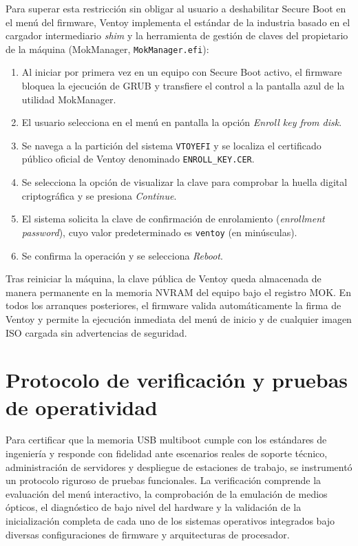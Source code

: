 \documentclass[12pt]{article}
\begin{document}
Para superar esta restricción sin obligar al usuario a deshabilitar Secure Boot en el menú del firmware, Ventoy implementa el estándar de la industria basado en el cargador intermediario \textit{shim} y la herramienta de gestión de claves del propietario de la máquina (MokManager, \texttt{MokManager.efi}):
\begin{enumerate}[noitemsep, topsep=2pt]
    \item Al iniciar por primera vez en un equipo con Secure Boot activo, el firmware bloquea la ejecución de GRUB y transfiere el control a la pantalla azul de la utilidad MokManager.
    \item El usuario selecciona en el menú en pantalla la opción \textit{Enroll key from disk}.
    \item Se navega a la partición del sistema \texttt{VTOYEFI} y se localiza el certificado público oficial de Ventoy denominado \texttt{ENROLL\_KEY.CER}.
    \item Se selecciona la opción de visualizar la clave para comprobar la huella digital criptográfica y se presiona \textit{Continue}.
    \item El sistema solicita la clave de confirmación de enrolamiento (\textit{enrollment password}), cuyo valor predeterminado es \texttt{ventoy} (en minúsculas).
    \item Se confirma la operación y se selecciona \textit{Reboot}.
\end{enumerate}

Tras reiniciar la máquina, la clave pública de Ventoy queda almacenada de manera permanente en la memoria NVRAM del equipo bajo el registro MOK. En todos los arranques posteriores, el firmware valida automáticamente la firma de Ventoy y permite la ejecución inmediata del menú de inicio y de cualquier imagen ISO cargada sin advertencias de seguridad.

\section{Protocolo de verificación y pruebas de operatividad}
\label{sec:protocoloVerificacion}

Para certificar que la memoria USB multiboot cumple con los estándares de ingeniería y responde con fidelidad ante escenarios reales de soporte técnico, administración de servidores y despliegue de estaciones de trabajo, se instrumentó un protocolo riguroso de pruebas funcionales. La verificación comprende la evaluación del menú interactivo, la comprobación de la emulación de medios ópticos, el diagnóstico de bajo nivel del hardware y la validación de la inicialización completa de cada uno de los sistemas operativos integrados bajo diversas configuraciones de firmware y arquitecturas de procesador.
\end{document}
